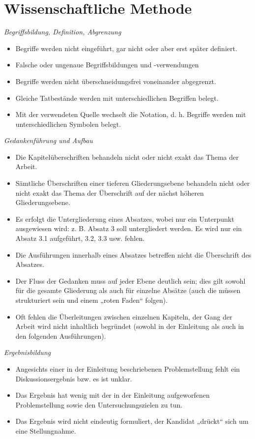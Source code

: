 \chapter{Wissenschaftliche Methode}

\emph{Begriffsbildung, Definition, Abgrenzung}
\begin{itemize}
    \item Begriffe werden nicht eingeführt, gar nicht oder aber erst später definiert.
    \item Falsche oder ungenaue Begriffsbildungen und -verwendungen
    \item Begriffe werden nicht überschneidungsfrei voneinander abgegrenzt.
    \item Gleiche Tatbestände werden mit unterschiedlichen Begriffen belegt.
    \item Mit der verwendeten Quelle wechselt die Notation, d. h. Begriffe werden mit unterschiedlichen Symbolen belegt.
\end{itemize}

\emph{Gedankenführung und Aufbau}
\begin{itemize}
    \item Die Kapitelüberschriften behandeln nicht oder nicht exakt das Thema der Arbeit.
    \item Sämtliche Überschriften einer tieferen Gliederungsebene behandeln nicht oder nicht exakt das Thema der Überschrift auf der nächst höheren Gliederungsebene.
    \item Es erfolgt die Untergliederung eines Absatzes, wobei nur ein Unterpunkt ausgewiesen wird: z. B. Absatz 3 soll untergliedert werden. Es wird nur ein Absatz 3.1 aufgeführt, 3.2, 3.3 usw. fehlen.
    \item Die Ausführungen innerhalb eines Absatzes betreffen nicht die Überschrift des Absatzes.
\item Der Fluss der Gedanken muss auf jeder Ebene deutlich sein; dies gilt sowohl für die gesamte Gliederung als auch für einzelne Absätze (auch die müssen strukturiert sein und einem „roten Faden“ folgen).
    \item Oft fehlen die Überleitungen zwischen einzelnen Kapiteln, der Gang der Arbeit wird nicht inhaltlich begründet (sowohl in der Einleitung als auch in den folgenden Ausführungen).
\end{itemize}

\newpage
\emph{Ergebnisbildung}
\begin{itemize}
    \item Angesichts einer in der Einleitung beschriebenen Problemstellung fehlt ein Diskussionsergebnis bzw. es ist unklar.
    \item Das Ergebnis hat wenig mit der in der Einleitung aufgeworfenen Problemstellung sowie den Untersuchungszielen zu tun.
    \item Das Ergebnis wird nicht eindeutig formuliert, der Kandidat „drückt“ sich um eine Stellungnahme.
\end{itemize}